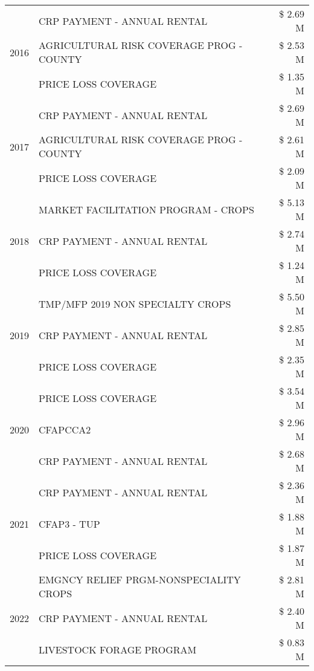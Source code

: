\begin{tabular}{llr}
\cline{1-3}
\multirow[t]{3}{*}{2016} & CRP PAYMENT - ANNUAL RENTAL & \$ 2.69 M \\
 & AGRICULTURAL RISK COVERAGE PROG - COUNTY & \$ 2.53 M \\
 & PRICE LOSS COVERAGE & \$ 1.35 M \\
\cline{1-3}
\multirow[t]{3}{*}{2017} & CRP PAYMENT - ANNUAL RENTAL & \$ 2.69 M \\
 & AGRICULTURAL RISK COVERAGE PROG - COUNTY & \$ 2.61 M \\
 & PRICE LOSS COVERAGE & \$ 2.09 M \\
\cline{1-3}
\multirow[t]{3}{*}{2018} & MARKET FACILITATION PROGRAM - CROPS & \$ 5.13 M \\
 & CRP PAYMENT - ANNUAL RENTAL & \$ 2.74 M \\
 & PRICE LOSS COVERAGE & \$ 1.24 M \\
\cline{1-3}
\multirow[t]{3}{*}{2019} & TMP/MFP 2019 NON SPECIALTY CROPS & \$ 5.50 M \\
 & CRP PAYMENT - ANNUAL RENTAL & \$ 2.85 M \\
 & PRICE LOSS COVERAGE & \$ 2.35 M \\
\cline{1-3}
\multirow[t]{3}{*}{2020} & PRICE LOSS COVERAGE & \$ 3.54 M \\
 & CFAPCCA2 & \$ 2.96 M \\
 & CRP PAYMENT - ANNUAL RENTAL & \$ 2.68 M \\
\cline{1-3}
\multirow[t]{3}{*}{2021} & CRP PAYMENT - ANNUAL RENTAL & \$ 2.36 M \\
 & CFAP3 - TUP & \$ 1.88 M \\
 & PRICE LOSS COVERAGE & \$ 1.87 M \\
\cline{1-3}
\multirow[t]{3}{*}{2022} & EMGNCY RELIEF PRGM-NONSPECIALITY CROPS & \$ 2.81 M \\
 & CRP PAYMENT - ANNUAL RENTAL & \$ 2.40 M \\
 & LIVESTOCK FORAGE PROGRAM & \$ 0.83 M \\
\cline{1-3}
\bottomrule
\end{tabular}
